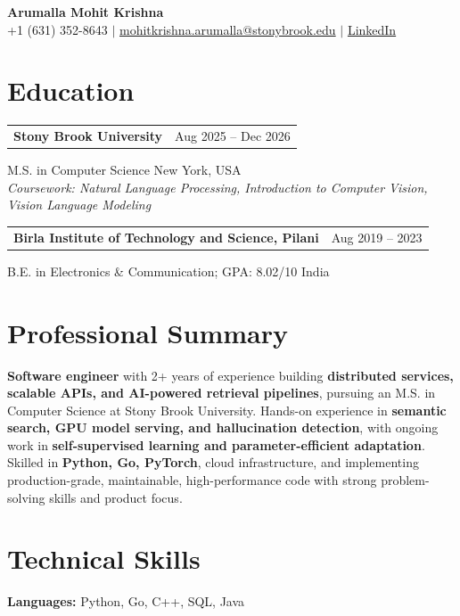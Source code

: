 \documentclass[letterpaper,10pt]{article}
\makeatletter
\newcommand{\entry}[2]{%
  \noindent
  \begin{tabularx}{\linewidth}
    {@{}>{\raggedright\arraybackslash}X@{\hspace{6pt}}r@{}}
    \textbf{#1} & #2
  \end{tabularx}\par
}
\makeatother
\begin{document}
\begin{center}
    {\LARGE\bfseries Arumalla Mohit Krishna}\\[3pt]
    +1 (631) 352-8643 $|$
    \href{mailto:mohitkrishna.arumalla@stonybrook.edu}
    {mohitkrishna.arumalla@stonybrook.edu} $|$
    \href{https://linkedin.com/in/mohit-krishna-arumalla}
    {LinkedIn}
\end{center}
\vspace{-8pt}

\section{Education}

\entry
  {\textbf{Stony Brook University}}
  {Aug 2025 -- Dec 2026}

M.S. in Computer Science \hfill New York, USA\\
\textit{
Coursework: Natural Language Processing,
Introduction to Computer Vision, Vision Language Modeling
}
\vspace{3pt}

\entry
  {\textbf{Birla Institute of Technology and Science, Pilani}}
  {Aug 2019 -- 2023}

B.E. in Electronics \& Communication; GPA: 8.02/10 \hfill India
\section{Professional Summary}

\textbf{Software engineer} with 2+ years of experience building \textbf{distributed services, scalable APIs, and AI-powered retrieval pipelines}, pursuing an M.S. in Computer Science at Stony Brook University. Hands-on experience in \textbf{semantic search, GPU model serving, and hallucination detection}, with ongoing work in \textbf{self-supervised learning and parameter-efficient adaptation}. Skilled in \textbf{Python, Go, PyTorch}, cloud infrastructure, and implementing production-grade, maintainable, high-performance code with strong problem-solving skills and product focus.
\section{Technical Skills}

\textbf{Languages:}
Python, Go, C++, SQL, Java\\
\end{document}
